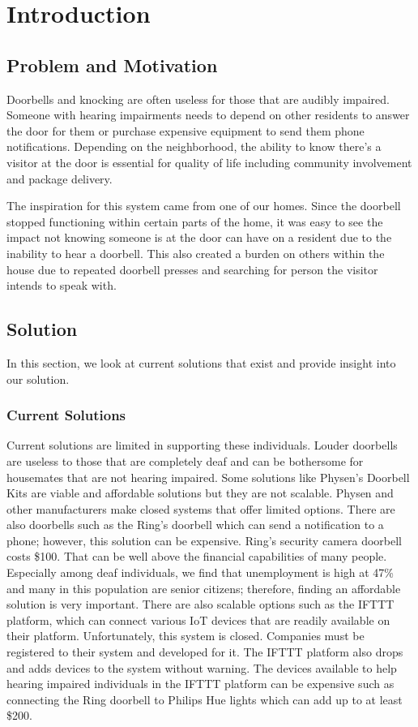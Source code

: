 \chapter{Introduction}

\section{Problem and Motivation}

Doorbells and knocking are often useless for those that are audibly impaired. Someone with hearing impairments needs to depend on other residents to answer the door for them or purchase expensive equipment to send them phone notifications. Depending on the neighborhood, the ability to know there’s a visitor at the door is essential for quality of life including community involvement and package delivery.

The inspiration for this system came from one of our homes. Since the doorbell stopped functioning within certain parts of the home, it was easy to see the impact not knowing someone is at the door can have on a resident due to the inability to hear a doorbell. This also created a burden on others within the house due to repeated doorbell presses and searching for person the visitor intends to speak with. 

\section{Solution}
In this section, we look at current solutions that exist and provide insight into our solution.

\subsection{Current Solutions}
Current solutions are limited in supporting these individuals. Louder doorbells are useless to those that are completely deaf and can be bothersome for housemates that are not hearing impaired. Some solutions like Physen’s Doorbell Kits are viable and affordable solutions but they are not scalable. Physen and other manufacturers make closed systems that offer limited options. There are also doorbells such as the Ring’s doorbell which can send a notification to a phone; however, this solution can be expensive. Ring’s security camera doorbell costs \$100. That can be well above the financial capabilities of many people. Especially among deaf individuals, we find that unemployment is high at 47\% \cite{pdf:deaf-employment} and many in this population are senior citizens; therefore, finding an affordable solution is very important. There are also scalable options such as the IFTTT platform, which can connect various IoT devices that are readily available on their platform. Unfortunately, this system is closed. Companies must be registered to their system and developed for it. The IFTTT platform also drops and adds devices to the system without warning. The devices available to help hearing impaired individuals in the IFTTT platform can be expensive such as connecting the Ring doorbell to Philips Hue lights which can add up to at least \$200.

